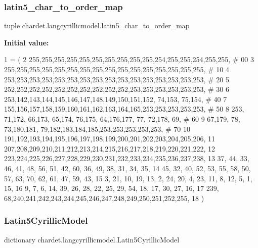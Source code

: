 \subsubsection{\texorpdfstring{latin5\+\_\+char\+\_\+to\+\_\+order\+\_\+map}{latin5\_char\_to\_order\_map}}
{\footnotesize\ttfamily tuple chardet.\+langcyrillicmodel.\+latin5\+\_\+char\+\_\+to\+\_\+order\+\_\+map}

{\bfseries Initial value\+:}
\begin{DoxyCode}
1 =  (
2 255,255,255,255,255,255,255,255,255,255,254,255,255,254,255,255,  \textcolor{comment}{# 00}
3 255,255,255,255,255,255,255,255,255,255,255,255,255,255,255,255,  \textcolor{comment}{# 10}
4 253,253,253,253,253,253,253,253,253,253,253,253,253,253,253,253,  \textcolor{comment}{# 20}
5 252,252,252,252,252,252,252,252,252,252,253,253,253,253,253,253,  \textcolor{comment}{# 30}
6 253,142,143,144,145,146,147,148,149,150,151,152, 74,153, 75,154,  \textcolor{comment}{# 40}
7 155,156,157,158,159,160,161,162,163,164,165,253,253,253,253,253,  \textcolor{comment}{# 50}
8 253, 71,172, 66,173, 65,174, 76,175, 64,176,177, 77, 72,178, 69,  \textcolor{comment}{# 60}
9  67,179, 78, 73,180,181, 79,182,183,184,185,253,253,253,253,253,  \textcolor{comment}{# 70}
10 191,192,193,194,195,196,197,198,199,200,201,202,203,204,205,206,
11 207,208,209,210,211,212,213,214,215,216,217,218,219,220,221,222,
12 223,224,225,226,227,228,229,230,231,232,233,234,235,236,237,238,
13  37, 44, 33, 46, 41, 48, 56, 51, 42, 60, 36, 49, 38, 31, 34, 35,
14  45, 32, 40, 52, 53, 55, 58, 50, 57, 63, 70, 62, 61, 47, 59, 43,
15   3, 21, 10, 19, 13,  2, 24, 20,  4, 23, 11,  8, 12,  5,  1, 15,
16   9,  7,  6, 14, 39, 26, 28, 22, 25, 29, 54, 18, 17, 30, 27, 16,
17 239, 68,240,241,242,243,244,245,246,247,248,249,250,251,252,255,
18 )
\end{DoxyCode}
\mbox{\label{namespacechardet_1_1langcyrillicmodel_a25f9ccb877512c68f92108d47bbf1894}} 
\subsubsection{\texorpdfstring{Latin5\+Cyrillic\+Model}{Latin5CyrillicModel}}
{\footnotesize\ttfamily dictionary chardet.\+langcyrillicmodel.\+Latin5\+Cyrillic\+Model}

